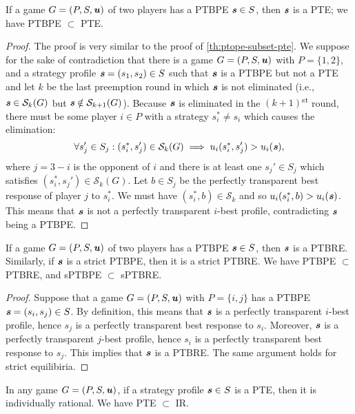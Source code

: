\begin{lemma}
	\label{th:ptbpe-subset-pte}
	If a game $G = (P, S, \boldsymbol{\mathit{u}})$ of two players has a PTBPE $\boldsymbol{\mathit{s}} \in S$, then $\boldsymbol{\mathit{s}}$ is a PTE; we have PTBPE $\subset$ PTE.
\end{lemma}

\begin{proof}
	The proof is very similar to the proof of \autoref{th:ptope-subset-pte}.
	We suppose for the sake of contradiction that there is a game $G = (P, S, \boldsymbol{\mathit{u}})$ with $P = \{1, 2\}$, and a strategy profile $\boldsymbol{\mathit{s}} = (s_1, s_2) \in S$ such that $\boldsymbol{\mathit{s}}$ is a PTBPE but not a PTE and let $k$ be the last preemption round in which $\boldsymbol{\mathit{s}}$ is not eliminated (i.e., $\boldsymbol{\mathit{s}} \in \mathcal{S}_k(G)$ but $\boldsymbol{\mathit{s}} \notin \mathcal{S}_{k+1}(G)$).
	Because $\boldsymbol{\mathit{s}}$ is eliminated in the $(k+1)$\textsuperscript{st} round, there must be some player $i \in P$ with a strategy $s_i^* \ne s_i$ which causes the elimination:
	\[
		\forall s_j' \in S_j: (s_i^*, s_j') \in \mathcal{S}_k(G) \implies u_i(s_i^*, s_j') > u_i(\boldsymbol{\mathit{s}}),
	\]
	where $j = 3 - i$ is the opponent of $i$ and there is at least one $s_j' \in S_j$ which satisfies $(s_i^*, s_j') \in \mathcal{S}_k(G)$.
	Let $b \in S_j$ be the perfectly transparent best response of player $j$ to $s_i^*$.
	We must have $(s_i^*, b) \in \mathcal{S}_k$ and so $u_i(s_i^*, b) > u_i(\boldsymbol{\mathit{s}})$.
	This means that $\boldsymbol{\mathit{s}}$ is not a perfectly transparent $i$-best profile, contradicting $\boldsymbol{\mathit{s}}$ being a PTBPE.
\end{proof}

\begin{lemma}
	\label{th:ptbpe-subset-ptbre}
	If a game $G = (P, S, \boldsymbol{\mathit{u}})$ of two players has a PTBPE $\boldsymbol{\mathit{s}} \in S$, then $\boldsymbol{\mathit{s}}$ is a PTBRE.
	Similarly, if $\boldsymbol{\mathit{s}}$ is a strict PTBPE, then it is a strict PTBRE.
	We have PTBPE $\subset$ PTBRE, and sPTBPE $\subset$ sPTBRE.
\end{lemma}

\begin{proof}
	Suppose that a game $G = (P, S, \boldsymbol{\mathit{u}})$ with $P = \{i, j\}$ has a PTBPE $\boldsymbol{\mathit{s}} = (s_i, s_j) \in S$.
	By definition, this means that $\boldsymbol{\mathit{s}}$ is a perfectly transparent $i$-best profile, hence $s_j$ is a perfectly transparent best response to $s_i$.
	Moreover, $\boldsymbol{\mathit{s}}$ is a perfectly transparent $j$-best profile, hence $s_i$ is a perfectly transparent best response to $s_j$.
	This implies that $\boldsymbol{\mathit{s}}$ is a PTBRE.
	The same argument holds for strict equilibiria.
\end{proof}

\begin{observation}
	\label{th:pte-subset-ir}
	In any game $G = (P, S, \boldsymbol{\mathit{u}})$, if a strategy profile $\boldsymbol{\mathit{s}} \in S$ is a PTE, then it is individually rational.
	We have PTE $\subset$ IR.
\end{observation}

